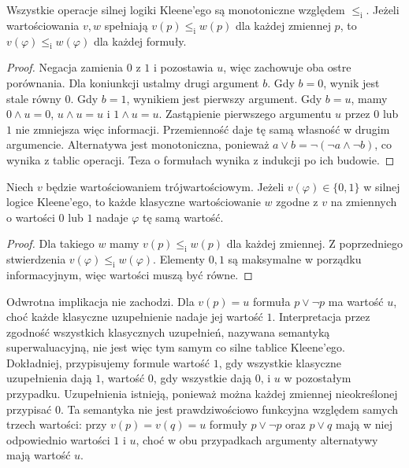 \begin{stwierdzenie}
\label{prop:ncl-kleene-information}
Wszystkie operacje silnej logiki Kleene'ego są
monotoniczne względem $\leq_{\mathrm i}$. Jeżeli
wartościowania $v,w$ spełniają $v(p)\leq_{\mathrm i}w(p)$
dla każdej zmiennej $p$, to
$v(\varphi)\leq_{\mathrm i}w(\varphi)$ dla każdej formuły.
\end{stwierdzenie}
\begin{proof}
Negacja zamienia $0$ z $1$ i pozostawia $u$, więc
zachowuje oba ostre porównania. Dla koniunkcji
ustalmy drugi argument $b$. Gdy $b=0$, wynik jest
stale równy $0$. Gdy $b=1$, wynikiem jest pierwszy
argument. Gdy $b=u$, mamy
$0\wedge u=0$, $u\wedge u=u$ i $1\wedge u=u$.
Zastąpienie pierwszego argumentu $u$ przez $0$ lub
$1$ nie zmniejsza więc informacji. Przemienność
daje tę samą własność w drugim argumencie.
Alternatywa jest monotoniczna, ponieważ
$a\vee b=\neg(\neg a\wedge\neg b)$, co wynika
z tablic operacji. Teza o formułach wynika
z indukcji po ich budowie.
\end{proof}

\begin{wniosek}
\label{cor:ncl-kleene-completions}
Niech $v$ będzie wartościowaniem trójwartościowym.
Jeżeli $v(\varphi)\in\{0,1\}$ w silnej logice
Kleene'ego, to każde klasyczne wartościowanie $w$
zgodne z $v$ na zmiennych o wartości $0$ lub $1$
nadaje $\varphi$ tę samą wartość.
\end{wniosek}
\begin{proof}
Dla takiego $w$ mamy $v(p)\leq_{\mathrm i}w(p)$
dla każdej zmiennej. Z poprzedniego stwierdzenia
$v(\varphi)\leq_{\mathrm i}w(\varphi)$.
Elementy $0,1$ są maksymalne w porządku
informacyjnym, więc wartości muszą być równe.
\end{proof}
Odwrotna implikacja nie zachodzi. Dla $v(p)=u$
formuła $p\vee\neg p$ ma wartość $u$, choć każde
klasyczne uzupełnienie nadaje jej wartość $1$.
Interpretacja przez zgodność wszystkich klasycznych
uzupełnień, nazywana semantyką superwaluacyjną,
nie jest więc tym samym co silne tablice Kleene'ego.
Dokładniej, przypisujemy formule wartość $1$, gdy
wszystkie klasyczne uzupełnienia dają $1$, wartość
$0$, gdy wszystkie dają $0$, i $u$ w pozostałym
przypadku. Uzupełnienia istnieją, ponieważ można
każdej zmiennej nieokreślonej przypisać $0$.
Ta semantyka nie jest prawdziwościowo funkcyjna
względem samych trzech wartości: przy $v(p)=v(q)=u$
formuły $p\vee\neg p$ oraz $p\vee q$ mają w niej
odpowiednio wartości $1$ i $u$, choć w obu
przypadkach argumenty alternatywy mają wartość $u$.

